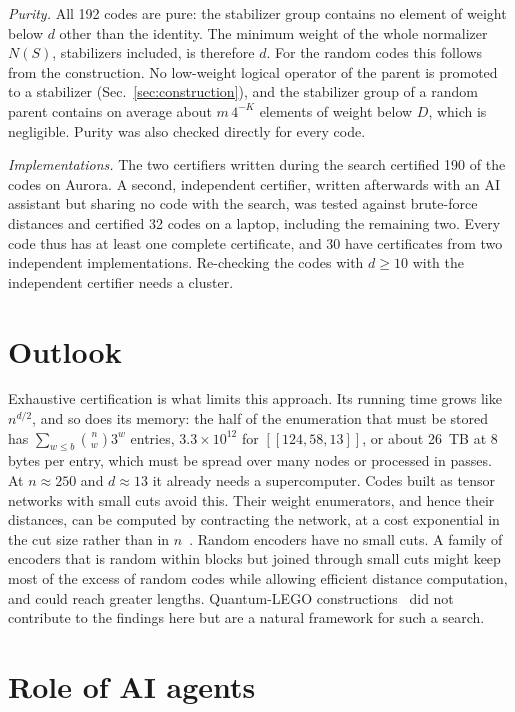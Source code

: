 \documentclass[reprint,pra,superscriptaddress,nofootinbib]{revtex4-2}
\begin{document}
\emph{Purity.} All 192 codes are pure: the stabilizer group contains no element of weight below $d$ other than the identity. The minimum weight of the whole normalizer $N(S)$, stabilizers included, is therefore $d$. For the random codes this follows from the construction. No low-weight logical operator of the parent is promoted to a stabilizer (Sec.~\ref{sec:construction}), and the stabilizer group of a random parent contains on average about $m\,4^{-K}$ elements of weight below $D$, which is negligible. Purity was also checked directly for every code.

\emph{Implementations.} The two certifiers written during the search certified 190 of the codes on Aurora. A second,
independent certifier, written afterwards with an AI assistant but sharing no code with the search, was tested against
brute-force distances and certified 32 codes on a laptop, including the remaining two. Every code thus has at least one
complete certificate, and 30 have certificates from two independent implementations. Re-checking the codes with
$d\ge10$ with the independent certifier needs a cluster.

\section{Outlook}

Exhaustive certification is what limits this approach. Its running time grows like $n^{d/2}$, and so does its memory:
the half of the enumeration that must be stored has $\sum_{w\le b}\binom{n}{w}3^w$ entries, $3.3\times10^{12}$ for
$[[124,58,13]]$, or about 26~TB at 8 bytes per entry, which must be spread over many nodes or processed in passes. At
$n\approx250$ and $d\approx13$ it already needs a supercomputer. Codes built as tensor networks with small cuts avoid
this. Their weight enumerators, and hence their distances, can be computed by contracting the network, at a cost
exponential in the cut size rather than in $n$~\cite{enumerators}. Random encoders have no small cuts. A family of
encoders that is random within blocks but joined through small cuts might keep most of the excess of random codes while
allowing efficient distance computation, and could reach greater lengths. Quantum-LEGO constructions~\cite{lego} did
not contribute to the findings here but are a natural framework for such a search.

\section{Role of AI agents}\label{sec:ai}
\end{document}
